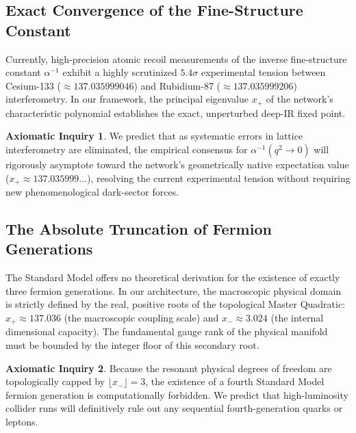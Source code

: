 \documentclass[11pt, letterpaper]{article}
\theoremstyle{definition}
\newtheorem{inquiry}{Axiomatic Inquiry}[section]
\theoremstyle{remark}
\begin{document}
\subsection{Exact Convergence of the Fine-Structure Constant}
Currently, high-precision atomic recoil measurements of the inverse fine-structure constant $\alpha^{-1}$ exhibit a highly scrutinized $5.4\sigma$ experimental tension between Cesium-133 ($\approx 137.035999046$) \cite{Parker2018} and Rubidium-87 ($\approx 137.035999206$) \cite{Morel2020} interferometry. In our framework, the principal eigenvalue $x_+$ of the network's characteristic polynomial establishes the exact, unperturbed deep-IR fixed point.
\begin{inquiry}
We predict that as systematic errors in lattice interferometry are eliminated, the empirical consensus for $\alpha^{-1}(q^2 \to 0)$ will rigorously asymptote toward the network's geometrically native expectation value ($x_+ \approx 137.035999\dots$), resolving the current experimental tension without requiring new phenomenological dark-sector forces.
\end{inquiry}

\subsection{The Absolute Truncation of Fermion Generations}
The Standard Model offers no theoretical derivation for the existence of exactly three fermion generations. In our architecture, the macroscopic physical domain is strictly defined by the real, positive roots of the topological Master Quadratic: $x_+ \approx 137.036$ (the macroscopic coupling scale) and $x_- \approx 3.024$ (the internal dimensional capacity). The fundamental gauge rank of the physical manifold must be bounded by the integer floor of this secondary root.
\begin{inquiry}
Because the resonant physical degrees of freedom are topologically capped by $\lfloor x_- \rfloor = 3$, the existence of a fourth Standard Model fermion generation is computationally forbidden. We predict that high-luminosity collider runs will definitively rule out any sequential fourth-generation quarks or leptons.
\end{inquiry}
\end{document}
